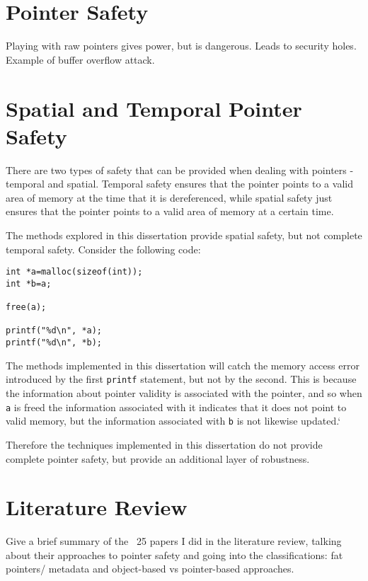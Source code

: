 \section{Pointer Safety}

Playing with raw pointers gives power, but is dangerous. Leads to security holes. Example of buffer overflow attack.

\section{Spatial and Temporal Pointer Safety}

There are two types of safety that can be provided when dealing with pointers - temporal and spatial.
Temporal safety ensures that the pointer points to a valid area of memory at the time that it is dereferenced, while spatial safety just ensures that the pointer points to a valid area of memory at a certain time.

The methods explored in this dissertation provide spatial safety, but not complete temporal safety.
Consider the following code:

\begin{verbatim}
int *a=malloc(sizeof(int));
int *b=a;

free(a);

printf("%d\n", *a);
printf("%d\n", *b);
\end{verbatim}

The methods implemented in this dissertation will catch the memory access error introduced by the first \verb!printf! statement, but not by the second.
This is because the information about pointer validity is associated with the pointer, and so when \verb!a! is freed the information associated with it indicates that it does not point to valid memory, but the information associated with \verb!b! is not likewise updated.`

Therefore the techniques implemented in this dissertation do not provide complete pointer safety, but provide an additional layer of robustness.

\section{Literature Review}

Give a brief summary of the ~25 papers I did in the literature review, talking about their approaches to pointer safety and going into the classifications: fat pointers/ metadata and object-based vs pointer-based approaches.


